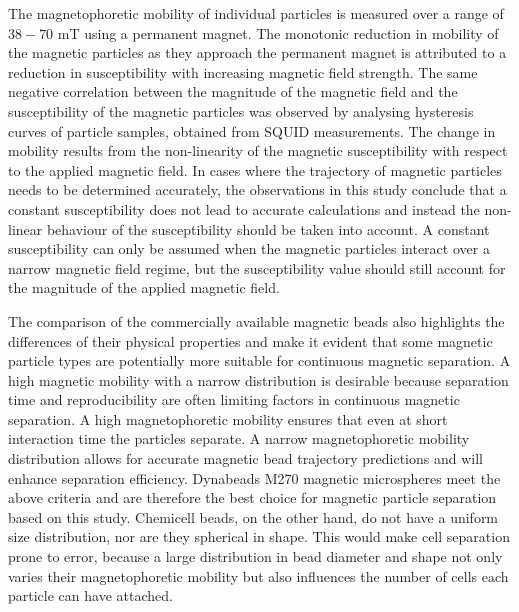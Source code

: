 The magnetophoretic mobility of individual particles is measured over a range of $38-70$ mT using a permanent magnet. The monotonic reduction in mobility of the magnetic particles as they approach the permanent magnet is attributed to a reduction in susceptibility with increasing magnetic field strength. The same negative correlation between the magnitude of the magnetic field and the susceptibility of the magnetic particles was observed by analysing hysteresis curves of particle samples, obtained from SQUID measurements. The change in mobility results from the non-linearity of the magnetic susceptibility with respect to the applied magnetic field. In cases where the trajectory of magnetic particles needs to be determined accurately, the observations in this study conclude that a constant susceptibility does not lead to accurate calculations and instead the non-linear behaviour of the susceptibility should be taken into account. A constant susceptibility can only be assumed when the magnetic particles interact over a narrow magnetic field regime, but the susceptibility value should still account for the magnitude of the applied magnetic field.

The comparison of the commercially available magnetic beads also highlights the differences of their physical properties and make it evident that some magnetic particle types are potentially more suitable for continuous magnetic separation. A high magnetic mobility with a narrow distribution is desirable because separation time and reproducibility are often limiting factors in continuous magnetic separation. A high magnetophoretic mobility ensures that even at short interaction time the particles separate. A narrow magnetophoretic mobility distribution allows for accurate magnetic bead trajectory predictions and will enhance separation efficiency. Dynabeads M270 magnetic microspheres meet the above criteria and are therefore the best choice for magnetic particle separation based on this study. Chemicell beads, on the other hand, do not have a uniform size distribution, nor are they spherical in shape. This would make cell separation prone to error, because a large distribution in bead diameter and shape not only varies their magnetophoretic mobility but also influences the number of cells each particle can have attached.





